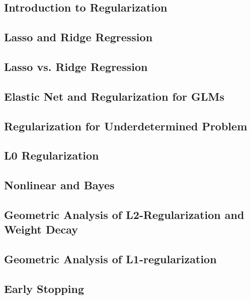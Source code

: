 

\subsection{Introduction to Regularization}


\subsection{Lasso and Ridge Regression}


\subsection{Lasso vs. Ridge Regression}


\subsection{Elastic Net and Regularization for GLMs}


\subsection{Regularization for Underdetermined Problem}


\subsection{L0 Regularization}


\subsection{Nonlinear and Bayes}


\subsection{Geometric Analysis of L2-Regularization and Weight Decay}


\subsection{Geometric Analysis of L1-regularization}


\subsection{Early Stopping}

